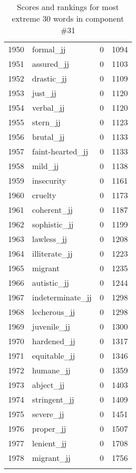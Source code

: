 \begin{longtable}[!htbp]{| rlr@{.}l |}
    1950 & formal\_jj & 0 & 1094 \\
    1951 & assured\_jj & 0 & 1103 \\
    1952 & drastic\_jj & 0 & 1109 \\
    1953 & just\_jj & 0 & 1120 \\
    1954 & verbal\_jj & 0 & 1120 \\
    1955 & stern\_jj & 0 & 1123 \\
    1956 & brutal\_jj & 0 & 1133 \\
    1957 & faint-hearted\_jj & 0 & 1133 \\
    1958 & mild\_jj & 0 & 1138 \\
    1959 & insecurity & 0 & 1161 \\
    1960 & cruelty & 0 & 1173 \\
    1961 & coherent\_jj & 0 & 1187 \\
    1962 & sophistic\_jj & 0 & 1199 \\
    1963 & lawless\_jj & 0 & 1208 \\
    1964 & illiterate\_jj & 0 & 1223 \\
    1965 & migrant & 0 & 1235 \\
    1966 & autistic\_jj & 0 & 1244 \\
    1967 & indeterminate\_jj & 0 & 1298 \\
    1968 & lecherous\_jj & 0 & 1298 \\
    1969 & juvenile\_jj & 0 & 1300 \\
    1970 & hardened\_jj & 0 & 1317 \\
    1971 & equitable\_jj & 0 & 1346 \\
    1972 & humane\_jj & 0 & 1359 \\
    1973 & abject\_jj & 0 & 1403 \\
    1974 & stringent\_jj & 0 & 1409 \\
    1975 & severe\_jj & 0 & 1451 \\
    1976 & proper\_jj & 0 & 1507 \\
    1977 & lenient\_jj & 0 & 1708 \\
    1978 & migrant\_jj & 0 & 1756 \\
    \hline
    \caption{Scores and rankings for most extreme 30 words in component \#31} \\
\end{longtable}
